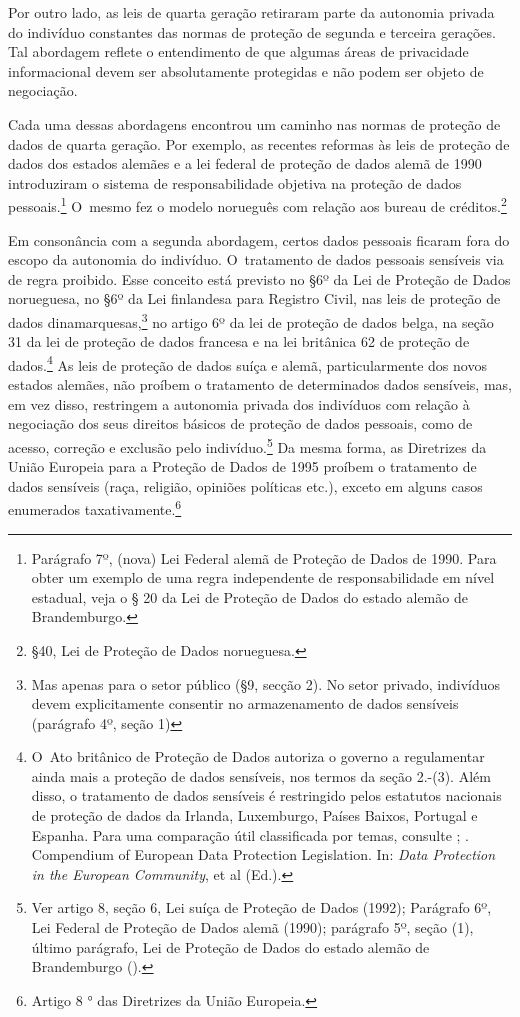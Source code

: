 Por outro lado, as leis de quarta geração retiraram parte da autonomia
privada do indivíduo constantes das normas de proteção de segunda e
terceira gerações. Tal abordagem reflete o entendimento de que algumas
áreas de privacidade informacional devem ser absolutamente protegidas e
não podem ser objeto de negociação.

Cada uma dessas abordagens encontrou um caminho nas normas de proteção
de dados de quarta geração. Por exemplo, as recentes reformas às leis de
proteção de dados dos estados alemães e a lei federal de proteção de
dados alemã de 1990 introduziram o sistema de responsabilidade objetiva
na proteção de dados pessoais.\footnote{Parágrafo 7º, (nova) Lei Federal
  alemã de Proteção de Dados de 1990. Para obter um exemplo de uma regra
  independente de responsabilidade em nível estadual, veja o § 20 da Lei
  de Proteção de Dados do estado alemão de Brandemburgo.} O~mesmo fez o
modelo norueguês com relação aos bureau de créditos.\footnote{§40, Lei
  de Proteção de Dados norueguesa.}

Em consonância com a segunda abordagem, certos dados pessoais ficaram
fora do escopo da autonomia do indivíduo. O~tratamento de dados pessoais
sensíveis via de regra proibido. Esse conceito está previsto no §6º da
Lei de Proteção de Dados norueguesa, no §6º da Lei finlandesa para
Registro Civil, nas leis de proteção de dados dinamarquesas,\footnote{Mas
  apenas para o setor público (§9, secção 2). No setor privado,
  indivíduos devem explicitamente consentir no armazenamento de dados
  sensíveis (parágrafo 4º, seção 1)} no artigo 6º da lei de proteção de
dados belga, na seção 31 da lei de proteção de dados francesa e na lei
britânica 62 de proteção de dados.\footnote{O~Ato britânico de Proteção
  de Dados autoriza o governo a regulamentar ainda mais a proteção de
  dados sensíveis, nos termos da seção 2.-(3). Além disso, o tratamento
  de dados sensíveis é restringido pelos estatutos nacionais de proteção
  de dados da Irlanda, Luxemburgo, Países Baixos, Portugal e Espanha.
  Para uma comparação útil classificada por temas, consulte
  ; . Compendium of European Data Protection
  Legislation. In: \emph{Data Protection in the European Community},
   et al (Ed.).} As leis de proteção de dados suíça e alemã,
particularmente dos novos estados alemães, não proíbem o tratamento de
determinados dados sensíveis, mas, em vez disso, restringem a autonomia
privada dos indivíduos com relação à negociação dos seus direitos
básicos de proteção de dados pessoais, como de acesso, correção e
exclusão pelo indivíduo.\footnote{Ver artigo 8, seção 6, Lei suíça de
  Proteção de Dados (1992); Parágrafo 6º, Lei Federal de Proteção de
  Dados alemã (1990); parágrafo 5º, seção (1), último parágrafo, Lei de
  Proteção de Dados do estado alemão de Brandemburgo ().} Da mesma
forma, as Diretrizes da União Europeia para a Proteção de Dados de 1995
proíbem o tratamento de dados sensíveis (raça, religião, opiniões
políticas etc.), exceto em alguns casos enumerados
taxativamente.\footnote{Artigo 8 ° das Diretrizes da União Europeia.}

